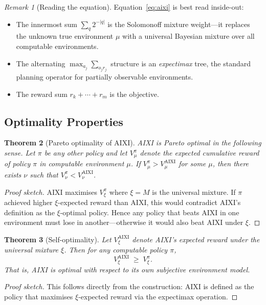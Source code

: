 \documentclass[11pt,a4paper]{article}
\newtheorem{theorem}{Theorem}[section]
\theoremstyle{definition}
\theoremstyle{remark}
\newtheorem{remark}[theorem]{Remark}
\begin{document}
\begin{remark}[Reading the equation]
Equation~\eqref{eq:aixi} is best read inside-out:
\begin{itemize}[nosep]
\item The innermost sum $\sum_q 2^{-|q|}$ is the Solomonoff mixture weight---it
      replaces the unknown true environment $\mu$ with a universal Bayesian
      mixture over all computable environments.
\item The alternating $\max_{a_j}\sum_{o_j r_j}$ structure is an
      \emph{expectimax} tree, the standard planning operator for
      partially observable environments.
\item The reward sum $r_k+\cdots+r_m$ is the objective.
\end{itemize}
\end{remark}

\subsection{Optimality Properties}

\begin{theorem}[Pareto optimality of AIXI]\label{thm:pareto}
AIXI is Pareto optimal in the following sense.  Let $\pi$ be any other policy
and let $V_\mu^\pi$ denote the expected cumulative reward of policy $\pi$ in
computable environment $\mu$.  If $V_\mu^\pi > V_\mu^{\mathrm{AIXI}}$ for
some $\mu$, then there exists $\nu$ such that
$V_\nu^\pi < V_\nu^{\mathrm{AIXI}}$.
\end{theorem}

\begin{proof}[Proof sketch]
AIXI maximises $V_\xi^\pi$ where $\xi=M$ is the universal mixture.
If $\pi$ achieved higher $\xi$-expected reward than AIXI, this would
contradict AIXI's definition as the $\xi$-optimal policy.  Hence any
policy that beats AIXI in one environment must lose in another---otherwise
it would also beat AIXI under $\xi$.
\end{proof}

\begin{theorem}[Self-optimality]\label{thm:selfopt}
Let $V_\xi^{\mathrm{AIXI}}$ denote AIXI's expected reward under the
universal mixture $\xi$.  Then for any computable policy $\pi$,
\[
  V_\xi^{\mathrm{AIXI}} \;\ge\; V_\xi^\pi.
\]
That is, AIXI is optimal with respect to its own subjective environment model.
\end{theorem}

\begin{proof}[Proof sketch]
This follows directly from the construction: AIXI is defined as the policy
that maximises $\xi$-expected reward via the expectimax operation.
\end{proof}
\end{document}
